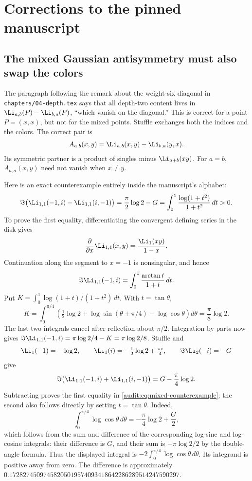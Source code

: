 \section{Corrections to the pinned manuscript}\label{sec:corrections}
\subsection{The mixed Gaussian antisymmetry must also swap the colors}

The paragraph following the remark about the weight-six diagonal in
\texttt{chapters/04-depth.tex} says that all depth-two content lives in
$\Li_{a,b}(P)-\Li_{b,a}(P)$, ``which vanish on the diagonal.''
This is correct for a point $P=(x,x)$, but not for the mixed points.
Stuffle exchanges both the indices and the colors. The correct pair is
\[
 A_{a,b}(x,y)=\Li_{a,b}(x,y)-\Li_{b,a}(y,x).
\]
Its symmetric partner is a product of singles minus $\Li_{a+b}(xy)$.
For $a=b$, $A_{a,a}(x,y)$ need not vanish when $x\ne y$.

Here is an exact counterexample entirely inside the manuscript's
alphabet:
\begin{equation}\label{audit:eq:mixed-counterexample}
 \Im\bigl(\Li_{1,1}(-1,i)-\Li_{1,1}(i,-1)\bigr)
 =\frac\pi2\log2-G
 =\int_0^1\frac{\log(1+t^2)}{1+t^2}\,dt>0.
\end{equation}
To prove the first equality, differentiating the convergent defining
series in the disk gives
\[
 \frac{\partial}{\partial x}\Li_{1,1}(x,y)
   =\frac{\Li_1(xy)}{1-x}.
\]
Continuation along the segment to $x=-1$ is nonsingular, and hence
\[
 \Im\Li_{1,1}(-1,i)=\int_0^1\frac{\arctan t}{1+t}\,dt.
\]
Put $K=\int_0^1\log(1+t)/(1+t^2)\,dt$. With $t=\tan\theta$,
\[
 K=\int_0^{\pi/4}\left(
   \tfrac12\log2+\log\sin(\theta+\pi/4)-\log\cos\theta
   \right)d\theta=\frac\pi8\log2.
\]
The last two integrals cancel after reflection about $\pi/2$.
Integration by parts now gives
$\Im\Li_{1,1}(-1,i)=\pi\log2/4-K=\pi\log2/8$.
Stuffle and
\[
 \Li_1(-1)=-\log2,\qquad
 \Li_1(i)=-\tfrac12\log2+\tfrac{\pi i}{4},\qquad
 \Im\Li_2(-i)=-G
\]
give
\[
 \Im\bigl(\Li_{1,1}(-1,i)+\Li_{1,1}(i,-1)\bigr)
   =G-\frac\pi4\log2.
\]
Subtracting proves the first equality in
\eqref{audit:eq:mixed-counterexample}; the second also follows directly by setting $t=\tan\theta$. Indeed,
\[
 \int_0^{\pi/4}\log\cos\theta\,d\theta
 =-\frac\pi4\log2+\frac G2,
\]
which follows from the sum and difference of the corresponding
log-sine and log-cosine integrals: their difference is $G$, and their
sum is $-\pi\log2/2$ by the double-angle formula. Thus the displayed
integral is $-2\int_0^{\pi/4}\log\cos\theta\,d\theta$.
Its integrand is positive away from zero. The difference is approximately
$0.17282745097458205019574093418642286289514247590297$.

